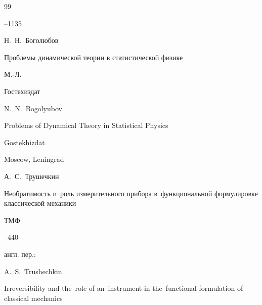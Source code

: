 \begin{thebibliography}{99}


--1135








\by Н.~Н.~Боголюбов

\book Проблемы динамической теории в статистической физике

\publaddr М.-Л.

\publ Гостехиздат



\misctransl

\by N.~N.~Bogolyubov 

\book Problems of Dynamical Theory in Statistical Physics

\publ Gostekhizdat

\publaddr Moscow, Leningrad








\by А.~С.~Трушечкин

\paper Необратимость и~роль измерительного прибора в~функциональной формулировке классической механики

\jour ТМФ




--440




\transl англ. пер.:~

\by A.~S.~Trushechkin

\paper Irreversibility and the~role of an~instrument in the~functional formulation of classical mechanics


\end{thebibliography}
